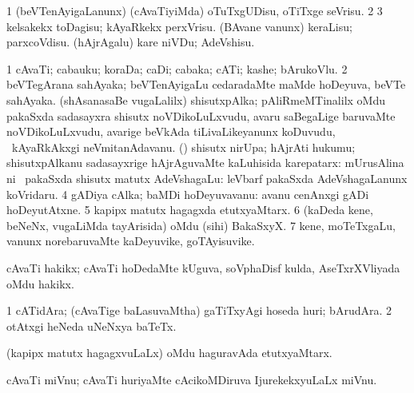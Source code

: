 {{{{{{\noindent 
\gl{\pagu}
\expl{}
\bmng
\bnum
\num{1}  (beVTenAyigaLanunx) (cAvaTiyiMda) oTuTxgUDisu, oTiTxge seVrisu. 
\num{2}  
\num{3}  kelsakekx toDagisu; kAyaRkekx perxVrisu. 
  
\banum
{} (BAvane \mo vanunx) keraLisu; parxcoVdisu. 
 (hAjrAgalu) kare niVDu; AdeVshisu. 
\eanum
\numie
\enum
\emng
\eentry

\bentry
{} 
\gl{\nA}
\expl{}
\bmng
\bnum
\num{1} cAvaTi; cabauku; koraDa; caDi; cabaka; cATi; kashe; bArukoVlu. 
\num{2} beVTegArana sahAyaka; beVTenAyigaLu cedaradaMte maMde hoDeyuva, beVTe sahAyaka. 
 (shAsanasaBe \mo vugaLalilx) 
\banum
{} shisutxpAlka; pAliRmeMTinalilx oMdu pakaSxda sadasayxra shisutx noVDikoLuLxvudu, avaru saBegaLige baruvaMte noVDikoLuLxvudu, avarige beVkAda tiLivaLikeyanunx koDuvudu, \mo\ kAyaRkAkxgi neVmitanAdavanu. 
 (\birx) shisutx nirUpa; hAjrAti hukumu; shisutxpAlkanu sadasayxrige hAjrAguvaMte kaLuhisida karepatarx:  mUrusAlina ni\rUpa\ 
 pakaSxda shisutx matutx AdeVshagaLu:  leVbarf pakaSxda AdeVshagaLanunx koVridaru. 
\eanum
\numie
\num{4} gADiya cAlka; baMDi hoDeyuvavanu:  avanu cenAnxgi gADi hoDeyutAtxne. 
\num{5} kapipx matutx hagagxda etutxyaMtarx. 
\num{6} (kaDeda kene, beNeNx, \mo vugaLiMda tayArisida) oMdu (sihi) BakaSxyX. 
\num{7} kene, moTeTxgaLu, \mo vanunx norebaruvaMte kaDeyuvike, goTAyisuvike. 
\enum
\emng

\noindent
\gl{\pagu}
\expl{}
\bmng
{} 
\emng
\eentry

\bentry
{} 
\gl{\nA}
\expl{}
\bmng
cAvaTi hakikx; cAvaTi hoDedaMte kUguva, soVphaDisf  kulda, AseTxrXVliyada oMdu hakikx. 
\emng
\eentry

\bentry
{} 
\gl{\nA}
\expl{}
\bmng
\bnum
\num{1} cATidAra; (cAvaTige baLasuvaMtha) gaTiTxyAgi hoseda huri; bArudAra. 
\num{2} otAtxgi heNeda uNeNxya baTeTx. 
\enum
\emng
\eentry

\bentry
{} 
\gl{\nA}
\expl{}
\bmng
(kapipx matutx hagagxvuLaLx) oMdu haguravAda etutxyaMtarx. 
\emng
\eentry

\bentry
{} 
\gl{\nA}
\expl{}
\bmng
cAvaTi miVnu; cAvaTi huriyaMte cAcikoMDiruva IjurekekxyuLaLx miVnu. 
\emng
\eentry

}}}}}}
